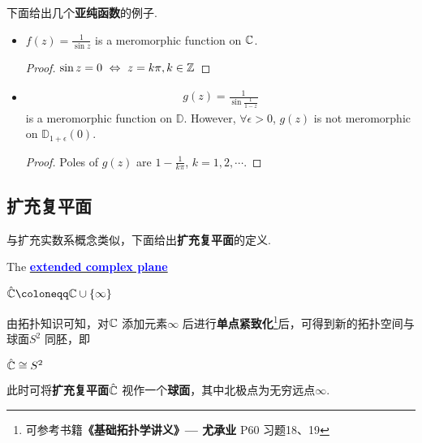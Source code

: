 	\begin{example}\label{ex 8.6.1}
		下面给出几个\textbf{亚纯函数}的例子.
		\begin{itemize}
			\item $f(z) = \frac{1}{\sin{z}}$ is a meromorphic function on $\mathbb{C}$.
			
			\vspace{2em}
			\begin{proof}
				$\sin{z} = 0 \,\, \Leftrightarrow \,\, z = k \pi , k \in \mathbb{Z}$
			\end{proof}
			
			\vspace{2em}
			
			\item \begin{align}
				g(z) = \frac{1}{\sin{\frac{1}{1 - z}}}
			\end{align}
			is a meromorphic function on $\mathbb{D}$. However, $\forall \epsilon > 0$, $g(z)$ is not meromorphic on $\mathbb{D}_{1 + \epsilon}(0)$.
			
			\vspace{2em}
			\begin{proof}
				Poles of $g(z)$ are $1 - \frac{1}{k\pi}$, $k = 1 , 2 , \cdots$.
			\end{proof}
		\end{itemize}
	\end{example}

\newpage
\subsection{扩充复平面}
	与扩充实数系概念类似，下面给出\textbf{扩充复平面}的定义.
	\begin{defn}\label{def 8.6.2}
		The \underline{\textcolor{blue}{\textbf{extended complex plane}}}
		\begin{center}
			$\hat{\C} \coloneqq \C \cup \{ \infty \}$
		\end{center}
	
		\vspace{1em}
		
		\begin{rmk}
			由拓扑知识可知，对$\mathbb{C}$ 添加元素$\infty$ 后进行\textbf{单点紧致化}\footnote{可参考书籍\textbf{《基础拓扑学讲义》--- 尤承业} P60 习题18、19}后，可得到新的拓扑空间与球面$S^2$ 同胚，即
			\begin{center}
				$\hat{\mathbb{C}} \cong S^2$
			\end{center}
			此时可将\textbf{扩充复平面$\hat{\mathbb{C}}$} 视作一个\textbf{球面}，其中北极点为无穷远点$\infty$.
		\end{rmk}
	\end{defn}
	
